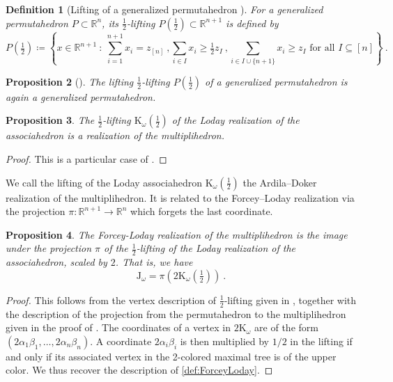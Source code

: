 \documentclass[twoside, 12pt]{amsart}
\newtheorem{definition}{Definition}[section]
\newtheorem{proposition}[definition]{Proposition}
\theoremstyle{remark}
\newcommand{\RR}{\mathbb{R}}
\newcommand{\K}{\mathrm{K}}
\newcommand{\J}{\mathrm{J}}
\begin{document}
\begin{definition}[Lifting of a generalized permutahedron {\cite[Definition 2.3]{AD13}}]
For a generalized permutahedron $P\subset \RR^n$, its \emph{$\tfrac{1}{2}$-lifting} $P \left(\tfrac{1}{2}\right) \subset \RR^{n+1}$ is defined by 
\[P \left(\tfrac{1}{2}\right) \coloneqq \left\{ x \in \RR^{n+1} \ : \ 
\sum_{i=1}^{n+1} x_i = z_{[n]} \ , 
\sum_{i \in I} x_i \geq \tfrac{1}{2}z_I \ ,
\sum_{i \in I \cup \{n+1\}} x_i \geq z_I 
\text{ for all } I \subseteq [n] \right\} \ . \]
\end{definition}

\begin{proposition}[{\cite[Proposition 2.4]{AD13}}] 
The lifting $\tfrac{1}{2}$-lifting $P \left(\tfrac{1}{2}\right)$ of a generalized permutahedron is again a generalized permutahedron. 
\end{proposition}

\begin{proposition} 
The $\tfrac{1}{2}$-lifting $\K_\omega\left(\tfrac{1}{2}\right)$ of the Loday realization of the associahedron is a realization of the multiplihedron. 
\end{proposition}
\begin{proof} 
This is a particular case of \cite[Corollary 4.10]{AD13}.
\end{proof}

We call the lifting of the Loday associahedron $\K_\omega\left(\tfrac{1}{2}\right)$ the Ardila--Doker realization of the multiplihedron. It is related to the Forcey--Loday realization via the projection $\pi: \RR^{n+1} \to \RR^n$ which forgets the last coordinate. 
 
\begin{proposition} 
\label{prop:lifting} 
The Forcey-Loday realization of the multiplihedron is the image under the projection $\pi$ of the $\tfrac{1}{2}$-lifting of the Loday realization of the associahedron, scaled by $2$. 
That is, we have  \[ \J_\omega = \pi \left(2 \K_\omega\left(\tfrac{1}{2}\right)\right) \ . \]
\end{proposition}

\begin{proof} 
  This follows from the vertex description of $\tfrac{1}{2}$-lifting given in \cite[Definition 3.5.3]{Doker11}, together with the description of the projection from the permutahedron to the multiplihedron given in the proof of \cite[Theorem 3.3.6]{Doker11}. 
  The coordinates of a vertex in $2 \K_\omega$ are of the form $(2\alpha_1\beta_1, \ldots, 2\alpha_n\beta_n)$. 
  A coordinate $2\alpha_i\beta_i$ is then multiplied by $1/2$ in the lifting if and only if its associated vertex in the 2-colored maximal tree is of the upper color. 
  We thus recover the description of \cref{def:ForceyLoday}.
\end{proof}
\end{document}
